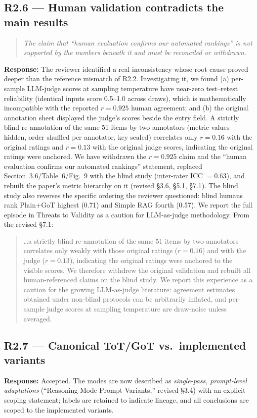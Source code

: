 \documentclass[11pt]{article}
\newcommand{\rcomment}[1]{\begin{quote}\itshape\color{black!70}#1\end{quote}}
\newcommand{\resp}{\noindent\textbf{Response:} }
\newcommand{\excerpt}[1]{\begin{quote}\small\color{blue!70!black}#1\end{quote}}
\begin{document}
\subsection*{R2.6 --- Human validation contradicts the main results}
\label{resp:r26}
\rcomment{The claim that ``human evaluation confirms our automated rankings'' is not supported by the numbers beneath it and must be reconciled or withdrawn.}
\resp The reviewer identified a real inconsistency whose root cause proved deeper than the reference mismatch of R2.2. Investigating it, we found (a) per-sample LLM-judge scores at sampling temperature have near-zero test--retest reliability (identical inputs score 0.5--1.0 across draws), which is mathematically incompatible with the reported $r=0.925$ human agreement; and (b) the original annotation sheet displayed the judge's scores beside the entry field. A strictly blind re-annotation of the same 51 items by two annotators (metric values hidden, order shuffled per annotator, key sealed) correlates only $r=0.16$ with the original ratings and $r=0.13$ with the original judge scores, indicating the original ratings were anchored. We have withdrawn the $r=0.925$ claim and the ``human evaluation confirms our automated rankings'' statement, replaced Section~3.6/Table~6/Fig.~9 with the blind study (inter-rater ICC $=0.63$), and rebuilt the paper's metric hierarchy on it (revised \S3.6, \S5.1, \S7.1). The blind study also reverses the specific ordering the reviewer questioned: blind humans rank Plain+GoT highest (0.71) and Simple RAG fourth (0.57). We report the full episode in Threats to Validity as a caution for LLM-as-judge methodology. From the revised \S7.1:
\excerpt{\ldots a strictly blind re-annotation of the same 51 items by two annotators correlates only weakly with those original ratings ($r=0.16$) and with the judge ($r=0.13$), indicating the original ratings were anchored to the visible scores. We therefore withdrew the original validation and rebuilt all human-referenced claims on the blind study. We report this experience as a caution for the growing LLM-as-judge literature: agreement estimates obtained under non-blind protocols can be arbitrarily inflated, and per-sample judge scores at sampling temperature are draw-noise unless averaged.}

\subsection*{R2.7 --- Canonical ToT/GoT vs.\ implemented variants}
\resp Accepted. The modes are now described as \emph{single-pass, prompt-level adaptations} (``Reasoning-Mode Prompt Variants,'' revised \S3.4) with an explicit scoping statement; labels are retained to indicate lineage, and all conclusions are scoped to the implemented variants.
\end{document}

